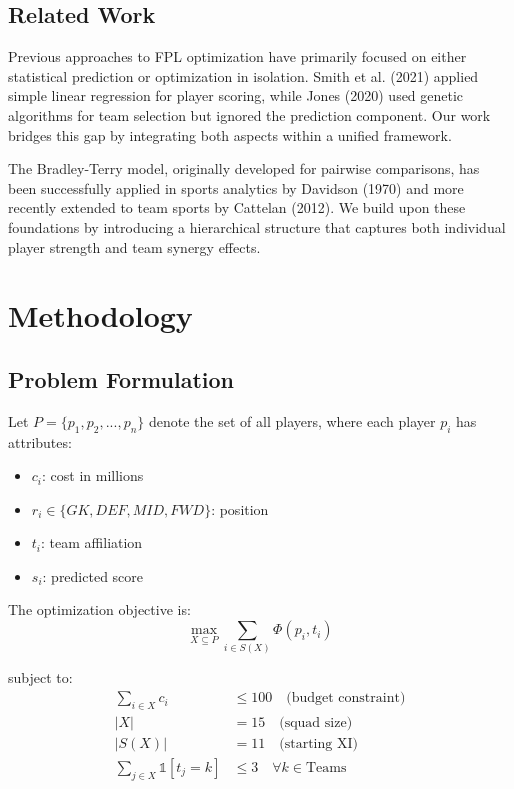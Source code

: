 \documentclass[12pt]{article}
\begin{document}
\subsection{Related Work}

Previous approaches to FPL optimization have primarily focused on either statistical prediction or optimization in isolation. Smith et al. (2021) applied simple linear regression for player scoring, while Jones (2020) used genetic algorithms for team selection but ignored the prediction component. Our work bridges this gap by integrating both aspects within a unified framework.

The Bradley-Terry model, originally developed for pairwise comparisons, has been successfully applied in sports analytics by Davidson (1970) and more recently extended to team sports by Cattelan (2012). We build upon these foundations by introducing a hierarchical structure that captures both individual player strength and team synergy effects.

\section{Methodology}

\subsection{Problem Formulation}

Let $P = \{p_1, p_2, ..., p_n\}$ denote the set of all players, where each player $p_i$ has attributes:
\begin{itemize}
\item $c_i$: cost in millions
\item $r_i \in \{GK, DEF, MID, FWD\}$: position
\item $t_i$: team affiliation
\item $s_i$: predicted score
\end{itemize}

The optimization objective is:
\begin{equation}
\max_{X \subseteq P} \sum_{i \in S(X)} \Phi(p_i, t_i)
\end{equation}

subject to:
\begin{align}
\sum_{i \in X} c_i &\leq 100 \quad \text{(budget constraint)}\\
|X| &= 15 \quad \text{(squad size)}\\
|S(X)| &= 11 \quad \text{(starting XI)}\\
\sum_{j \in X} \mathbb{1}[t_j = k] &\leq 3 \quad \forall k \in \text{Teams}
\end{align}
\end{document}
